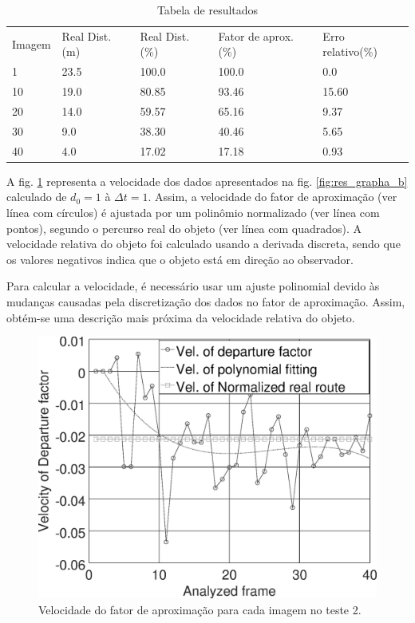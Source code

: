 \begin{table}[H]
\setlength{\tabcolsep}{1 pt} 
\caption{Tabela de resultados}
\begin{tabular}{lllll}
Imagem & Real Dist.(m) & Real Dist.(\%) & Fator de aprox.(\%) & Erro relativo(\%)\\
1 & 23.5 & 100.0 & 100.0 & 0.0 \\
10 & 19.0 & 80.85 & 93.46 & 15.60 \\
20 & 14.0 & 59.57 & 65.16 & 9.37 \\
30 & 9.0 & 38.30 & 40.46 & 5.65 \\
40 & 4.0 & 17.02 & 17.18 & 0.93
\end{tabular}
\label{tab:tab1}
\end{table}

A fig. \ref{fig:res_grapha_bv} representa a velocidade dos dados apresentados 
na fig. \ref{fig:res_grapha_b} calculado de $d_0=1$ à $\Delta t=1$.
Assim, a velocidade do fator de aproximação (ver línea com círculos) é ajustada por um polinômio
normalizado (ver línea com pontos), segundo o percurso real do objeto (ver línea com quadrados).
A velocidade relativa do objeto foi calculado usando a derivada
discreta, sendo que os valores negativos indica que o objeto está
em direção ao observador.

Para calcular a velocidade, é necessário usar um ajuste polinomial devido 
às mudanças causadas pela discretização dos dados no fator de aproximação.
Assim, obtém-se uma descrição mais próxima da velocidade relativa do 
objeto.

\begin{figure}[H]
\includegraphics[width=\columnwidth]{images/graphvelocity.eps}
\caption{Velocidade do fator de aproximação para cada imagem no teste 2.}
\label{fig:res_grapha_bv}
\end{figure}
